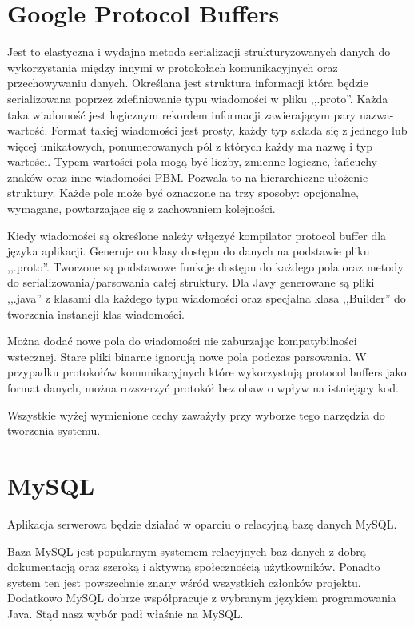 \section[Google Protocol Buffers]{Google Protocol Buffers} \label{protobuf}

\par{Jest to elastyczna i wydajna metoda serializacji strukturyzowanych danych do wykorzystania między innymi w protokołach komunikacyjnych oraz przechowywaniu danych. Określana jest struktura informacji która będzie serializowana poprzez zdefiniowanie typu wiadomości w pliku ,,.proto''. Każda taka wiadomość jest logicznym rekordem informacji zawierającym pary nazwa-wartość. Format takiej wiadomości jest prosty, każdy typ składa się z jednego lub więcej unikatowych, ponumerowanych pól z których każdy ma nazwę i typ wartości. Typem wartości pola mogą być liczby, zmienne logiczne, łańcuchy znaków oraz inne wiadomości PBM. Pozwala to na hierarchiczne ułożenie struktury. Każde pole może być oznaczone na trzy sposoby: opcjonalne, wymagane, powtarzające się z zachowaniem kolejności.}

\par{Kiedy wiadomości są określone należy włączyć kompilator protocol buffer dla języka aplikacji. Generuje on klasy dostępu do danych na podstawie pliku ,,.proto''. Tworzone są podstawowe funkcje dostępu do każdego pola oraz metody do serializowania/parsowania całej struktury. Dla Javy generowane są pliki ,,.java'' z klasami dla każdego typu wiadomości oraz specjalna klasa ,,Builder'' do tworzenia instancji klas wiadomości.}

\par{Można dodać nowe pola do wiadomości nie zaburzając kompatybilności wstecznej. Stare pliki binarne ignorują nowe pola podczas parsowania. W przypadku protokołów komunikacyjnych które wykorzystują protocol buffers jako format danych, można rozszerzyć protokół bez obaw o wpływ na istniejący kod.}

\par{Wszystkie wyżej wymienione cechy zaważyły przy wyborze tego narzędzia do tworzenia systemu.}

\section[MySQL]{MySQL}

\par{Aplikacja serwerowa będzie działać w oparciu o relacyjną bazę danych MySQL.} 

\par{Baza MySQL jest popularnym systemem relacyjnych baz danych z dobrą dokumentacją oraz szeroką i aktywną społecznością użytkowników. Ponadto system ten jest powszechnie znany wśród wszystkich członków projektu. Dodatkowo MySQL dobrze współpracuje z wybranym językiem programowania Java. Stąd nasz wybór padł właśnie na MySQL.}

